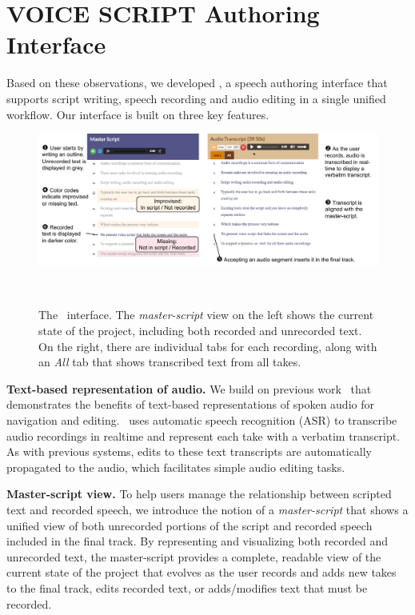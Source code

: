 \section{VOICE SCRIPT Authoring Interface}

Based on these observations, we developed \systemname, a speech authoring interface that supports script writing, speech recording and audio editing in a single unified workflow. Our interface is built on three key features.

\begin{figure}
  \centering
  \includegraphics[width=2.0\columnwidth]{figures/ui_aligned}
  \caption{The \systemname\ interface. The \textit{master-script} view on the left shows the current state of the project, including both recorded and unrecorded text. On the right, there are individual tabs for each recording, along with an \textit{All} tab that shows transcribed text from all takes.}~\label{fig:ui_aligned}
\end{figure}

\textbf{Text-based representation of audio.} We build on previous work~\cite{casares2002simplifying,whittaker2004semantic,berthouzoz2012tools,rubin2013content} that demonstrates the benefits of text-based representations of spoken audio for navigation and editing. \systemname\ uses automatic speech recognition (ASR) to transcribe audio recordings in realtime and represent each take with a verbatim transcript. As with previous systems, edits to these text transcripts are automatically propagated to the audio, which facilitates simple audio editing tasks. 

\textbf{Master-script view.} To help users manage the relationship between scripted text and recorded speech, we introduce the notion of a \emph{master-script} that shows a unified view of both unrecorded portions of the script and recorded speech included in the final track. By representing and visualizing both recorded and unrecorded text, the master-script provides a complete, readable view of the current state of the project that evolves as the user records and adds new takes to the final track, edits recorded text, or adds/modifies text that must be recorded. 


